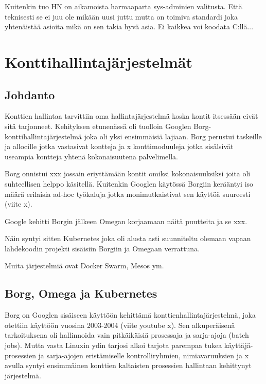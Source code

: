 \documentclass[finnish]{tktltiki2}
\theoremstyle{definition}
\theoremstyle{remark}
\begin{document}
Kuitenkin tuo HN on aikamoista harmaaparta sys-adminien valitusta. Että teknisesti se ei juu ole mikään uusi juttu mutta on toimiva standardi joka yhtenäistää asioita mikä on sen takia hyvä asia. Ei kaikkea voi koodata C:llä...

\section{Konttihallintajärjestelmät}

\subsection{Johdanto}

Konttien hallintaa tarvittiin oma hallintajärjestelmä koska kontit itsessään eivät sitä tarjonneet. Kehityksen etunenässä oli tuolloin Googlen Borg-konttihallintajärjestelmä joka oli yksi ensimmäisiä lajiaan. Borg perustui taskeille ja allocille jotka vastasivat kontteja ja x konttimoduuleja jotka sisälsivät useampia kontteja yhtenä kokonaisuutena palvelimella.

Borg onnistui xxx jossain eriyttämään kontit omiksi kokonaisuuksiksi joita oli suhteellisen helppo käsitellä. Kuitenkin Googlen käytössä Borgiin kerääntyi iso määrä erilaisia ad-hoc työkaluja jotka monimutkaistivat sen käyttöä suureesti (viite x).

Google kehitti Borgin jälkeen Omegan korjaamaan näitä puutteita ja se xxx.

Näin syntyi sitten Kubernetes joka oli alusta asti suunniteltu olemaan vapaan lähdekoodin projekti sisäisiin Borgiin ja Omegaan verrattuna.

Muita järjestelmiä ovat Docker Swarm, Mesos ym.

\subsection{Borg, Omega ja Kubernetes}

Borg on Googlen sisäiseen käyttöön kehittämä konttienhallintajärjestelmä, joka otettiin käyttöön vuosina 2003-2004 (viite youtube x). Sen alkuperäisenä tarkoituksena oli hallinnoida vain pitkäikäisiä prosessaja ja sarja-ajoja (batch jobs). Mutta vasta Linuxin ydin tarjosi alkoi tarjota parempaa tukea käyttäjä-prosessien ja sarja-ajojen eristämiselle kontrolliryhmien, nimiavaruuksien ja x avulla syntyi ensimmäinen konttien kaltaisten prosessien hallintaan kehittynyt järjestelmä. \cite{borg-omega-kubernetes}
\end{document}
